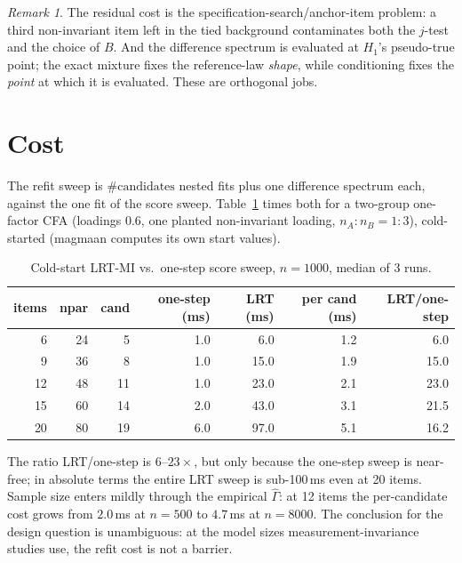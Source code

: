 \documentclass[11pt]{article}
\theoremstyle{plain}
\theoremstyle{remark}
\newtheorem*{remark}{Remark}
\begin{document}
\begin{remark}
The residual cost is the specification-search/anchor-item problem: a third
non-invariant item left in the tied background contaminates both the $j$-test and
the choice of $B$. And the difference spectrum is evaluated at $H_1$'s pseudo-true
point; the exact mixture fixes the reference-law \emph{shape}, while conditioning
fixes the \emph{point} at which it is evaluated. These are orthogonal jobs.
\end{remark}

\section{Cost}

The refit sweep is $\#\text{candidates}$ nested fits plus one difference spectrum
each, against the one fit of the score sweep. Table~\ref{tab:cost} times both for
a two-group one-factor CFA (loadings $0.6$, one planted non-invariant loading,
$n_A:n_B = 1{:}3$), cold-started (magmaan computes its own start values).

\begin{table}[h]
\centering
\caption{Cold-start LRT-MI vs.\ one-step score sweep, $n=1000$, median of 3 runs.}
\label{tab:cost}
\begin{tabular}{rrrrrrr}
\toprule
items & npar & cand & one-step (ms) & LRT (ms) & per cand (ms) & LRT/one-step \\
\midrule
 6 & 24 &  5 & 1.0 &  6.0 & 1.2 & 6.0 \\
 9 & 36 &  8 & 1.0 & 15.0 & 1.9 & 15.0 \\
12 & 48 & 11 & 1.0 & 23.0 & 2.1 & 23.0 \\
15 & 60 & 14 & 2.0 & 43.0 & 3.1 & 21.5 \\
20 & 80 & 19 & 6.0 & 97.0 & 5.1 & 16.2 \\
\bottomrule
\end{tabular}
\end{table}

The ratio LRT/one-step is $6$--$23\times$, but only because the one-step sweep is
near-free; in absolute terms the entire LRT sweep is sub-100\,ms even at 20 items.
Sample size enters mildly through the empirical $\hat\Gamma$: at 12 items the
per-candidate cost grows from $2.0$\,ms at $n=500$ to $4.7$\,ms at $n=8000$. The
conclusion for the design question is unambiguous: at the model sizes
measurement-invariance studies use, the refit cost is not a barrier.
\end{document}
